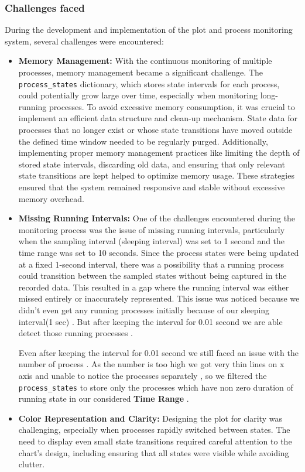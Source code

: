 \documentclass[12pt]{article}
\begin{document}
\subsubsection{Challenges faced}

During the development and implementation of the plot and process monitoring system, several challenges were encountered:

\begin{itemize}
     \item \textbf{Memory Management:} With the continuous monitoring of multiple processes, memory management became a significant challenge. The \texttt{process\_states} dictionary, which stores state intervals for each process, could potentially grow large over time, especially when monitoring long-running processes. To avoid excessive memory consumption, it was crucial to implement an efficient data structure and clean-up mechanism. State data for processes that no longer exist or whose state transitions have moved outside the defined time window needed to be regularly purged. Additionally, implementing proper memory management practices like limiting the depth of stored state intervals, discarding old data, and ensuring that only relevant state transitions are kept helped to optimize memory usage. These strategies ensured that the system remained responsive and stable without excessive memory overhead.

     \item \textbf{Missing Running Intervals:} One of the challenges encountered during the monitoring process was the issue of missing running intervals, particularly when the sampling interval (sleeping interval) was set to 1 second and the time range was set to 10 seconds. Since the process states were being updated at a fixed 1-second interval, there was a possibility that a running process could transition between the sampled states without being captured in the recorded data. This resulted in a gap where the running interval was either missed entirely or inaccurately represented. This issue was noticed because we didn't even get any running processes initially because of our sleeping interval(1 sec) . But after keeping the interval for 0.01 second we are able detect those running processes .

     Even after keeping the interval for 0.01 second we still faced an issue with the number of process . As the number is too high we got very thin lines on x axis and unable to notice the processes separately , so we filtered the \texttt{process\_states} to store only the processes which have non zero duration of running state in our considered \textbf{Time Range} .

     \item \textbf{Color Representation and Clarity:} Designing the plot for clarity was challenging, especially when processes rapidly switched between states. The need to display even small state transitions required careful attention to the chart's design, including ensuring that all states were visible while avoiding clutter.
\end{itemize}
\end{document}
